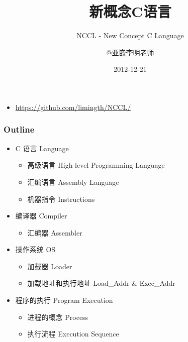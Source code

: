 \documentclass[10pt]{beamer}
\title{新概念C语言}
\subtitle{NCCL - New Concept C Language}
\author{@亚嵌李明老师}
\institute{limingth@gmail.com}
\date{2012-12-21}
\begin{document}
\begin{frame}
\titlepage
\begin{itemize}
\item 	\url{https://github.com/limingth/NCCL/}
\end{itemize}
\end{frame}

\begin{frame}
\frametitle{Outline}
\begin{itemize}
\item C 语言 Language   
	\begin{itemize}
	\item  
        高级语言 High-level Programming Language
	\item 
        汇编语言 Assembly Language
	\item 
        机器指令 Instructions
	\end{itemize}

\item 编译器 Compiler  
	\begin{itemize}  
	\item  
        汇编器 Assembler
	\end{itemize}
\item 操作系统 OS
	\begin{itemize}
	\item  
        加载器 Loader
	\item  
        加载地址和执行地址 Load_Addr & Exec_Addr
	\end{itemize}
\item 程序的执行 Program Execution
	\begin{itemize}
	\item  
        进程的概念 Process
	\item  
        执行流程 Execution Sequence
	\end{itemize}
\end{itemize}
\tableofcontents[currentsection]
\end{frame}



\end{document}
